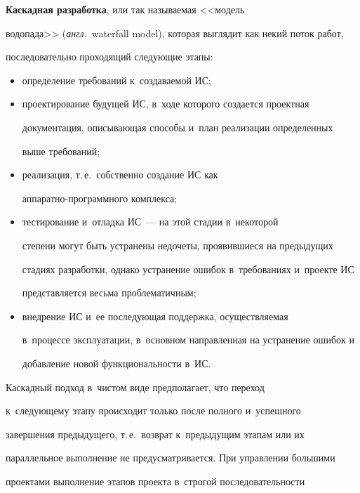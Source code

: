      


     \textbf{Каскадная разработка}, или так называемая <<модель 


водопада>> (\textit{англ.}\ waterfall model), которая выглядит как некий поток работ, 


последовательно проходящий следующие этапы:


     \begin{itemize}


     \item определение требований к~создаваемой ИС;


\item  проектирование будущей ИС, в~ходе которого создается проектная 


документация, описывающая способы и~план реализации определенных 


выше требований;


     \item реализация, т.\,е.\ собственно создание ИС как  


ап\-па\-рат\-но-про\-грам\-мно\-го комплекса;


     \item  тестирование и~отладка ИС~--- на этой стадии в~некоторой 


степени могут быть устранены недочеты, проявившиеся на предыдущих 


стадиях разработки, однако устранение ошибок в~требованиях и~проекте ИС 


представляется весьма проблематичным;


     \item  внедрение ИС и~ее последующая поддержка, осуществляемая 


в~процессе эксплуатации, в~основном направленная на устранение ошибок и~


добавление новой функциональности в~ИС.


     \end{itemize}


    


     Каскадный подход в~чистом виде предполагает, что переход 


к~следующему этапу происходит только после полного и~успешного 


завершения предыдущего, т.\,е.\ возврат к~предыдущим этапам или их 


параллельное выполнение не предусматривается. При управлении большими 


проектами выполнение этапов проекта в~строгой последовательности 


